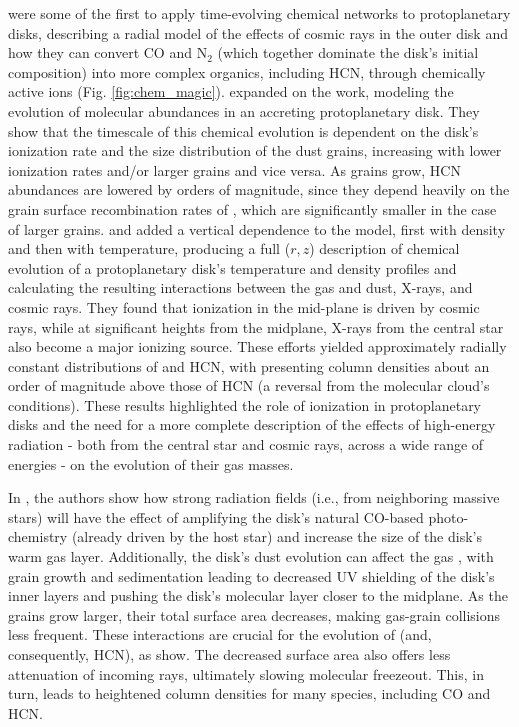 \citet{Aikawa1997} were some of the first to apply time-evolving chemical networks to protoplanetary disks, describing a radial model of the effects of cosmic rays in the outer disk and how they can convert CO and N$_2$ (which together dominate the disk's initial composition) into more complex organics, including HCN, through chemically active ions (Fig. \ref{fig:chem_magic}). \citet{Aikawa1999} expanded on the work, modeling the evolution of molecular abundances in an accreting protoplanetary disk. They show that the timescale of this chemical evolution is dependent on the disk's ionization rate and the size distribution of the dust grains, increasing with lower ionization rates and/or larger grains and vice versa. As grains grow, HCN abundances are lowered by orders of magnitude, since they depend heavily on the grain surface recombination rates of \hco{} \citep{AikawaHerbst1999b}, which are significantly smaller in the case of larger grains. \citet{AikawaHerbst1999a} and \citet{Aikawa2002} added a vertical dependence to the model, first with density and then with temperature, producing a full ($r, z$) description of chemical evolution of a protoplanetary disk's temperature and density profiles and calculating the resulting interactions between the gas and dust, X-rays, and cosmic rays. They found that ionization in the mid-plane is driven by cosmic rays, while at significant heights from the midplane, X-rays from the central star also become a major ionizing source. These efforts yielded approximately radially constant distributions of \hco{} and HCN, with \hco{} presenting column densities about an order of magnitude above those of HCN (a reversal from the molecular cloud's conditions). These results highlighted the role of ionization in protoplanetary disks and the need for a more complete description of the effects of high-energy radiation - both from the central star and cosmic rays, across a wide range of energies - on the evolution of their gas masses.


In \citet{Fogel2011}, the authors show how strong radiation fields (i.e., from neighboring massive stars) will have the effect of amplifying the disk's natural CO-based photo-chemistry (already driven by the host star) and increase the size of the disk's warm gas layer. Additionally, the disk's dust evolution can affect the gas \citep{Fogel2011,Akimkin2013}, with grain growth and sedimentation leading to decreased UV shielding of the disk's inner layers and pushing the disk's molecular layer closer to the midplane. As the grains grow larger, their total surface area decreases, making gas-grain collisions less frequent. These interactions are crucial for the evolution of \hco{} (and, consequently, HCN), as \citet{Aikawa1999b} show. The decreased surface area also offers less attenuation of incoming rays, ultimately slowing molecular freezeout. This, in turn, leads to heightened column densities for many species, including CO and HCN.


